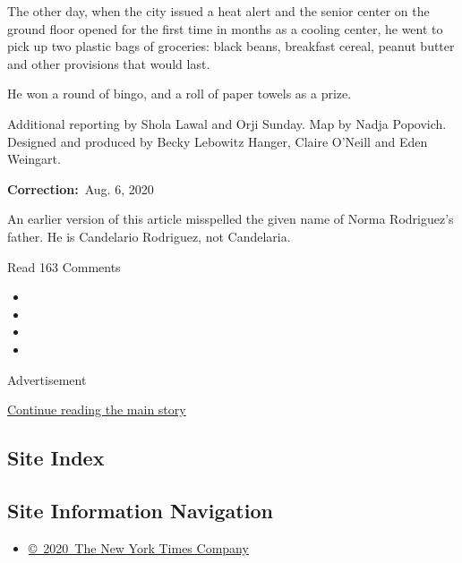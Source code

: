 The other day, when the city issued a heat alert and the senior center
on the ground floor opened for the first time in months as a cooling
center, he went to pick up two plastic bags of groceries: black beans,
breakfast cereal, peanut butter and other provisions that would last.

He won a round of bingo, and a roll of paper towels as a prize.

Additional reporting by Shola Lawal and Orji Sunday. Map by Nadja
Popovich. Designed and produced by Becky Lebowitz Hanger, Claire O'Neill
and Eden Weingart.

\textbf{Correction:}~Aug. 6, 2020

An earlier version of this article misspelled the given name of Norma
Rodriguez's father. He is Candelario Rodriguez, not Candelaria.

Read 163 Comments

\begin{itemize}
\item
\item
\item
\item
\end{itemize}

Advertisement

\protect\hyperlink{after-bottom}{Continue reading the main story}

\hypertarget{site-index}{%
\subsection{Site Index}\label{site-index}}

\hypertarget{site-information-navigation}{%
\subsection{Site Information
Navigation}\label{site-information-navigation}}

\begin{itemize}
\tightlist
\item
  \href{https://help.nytimes3xbfgragh.onion/hc/en-us/articles/115014792127-Copyright-notice}{©~2020~The
  New York Times Company}
\end{itemize}

